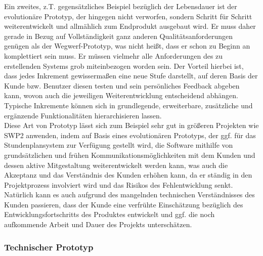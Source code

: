 \documentclass{swp1}
\begin{document}
Ein zweites, z.T. gegensätzliches Beispiel bezüglich der Lebensdauer ist der evolutionäre Prototyp, der hingegen nicht verworfen, sondern Schritt für Schritt weiterentwickelt und allmählich zum Endprodukt ausgebaut wird. Er muss daher gerade in Bezug auf Vollständigkeit ganz anderen Qualitätsanforderungen genügen als der Wegwerf-Prototyp, was nicht heißt, dass er schon zu Beginn an komplettiert sein muss. Er müssen vielmehr alle Anforderungen des zu erstellenden Systems grob miteinbezogen worden sein. Der Vorteil hierbei ist, dass jedes Inkrement gewissermaßen eine neue Stufe darstellt, auf deren Basis der Kunde bzw. Benutzer diesen testen und sein persönliches Feedback abgeben kann, wovon auch die jeweiligen Weiterentwicklung entscheidend abhängen. Typische Inkremente können sich in grundlegende, erweiterbare, zusätzliche und ergänzende Funktionalitäten hierarchisieren lassen. \\
Diese Art von Prototyp lässt sich zum Beispiel sehr gut in größeren Projekten wie SWP2 anwenden, indem auf Basis eines evolutionären Prototyps, der ggf. für das Stundenplansystem zur Verfügung gestellt wird, die Software mithilfe von grundsätzlichen und frühen Kommunikationsmöglichkeiten mit dem Kunden und dessen aktive Mitgestaltung  weiterentwickelt werden kann, was auch die Akzeptanz und das Verständnis des Kunden erhöhen kann, da er ständig in den Projektprozess involviert wird und das Risikos des Fehlentwicklung senkt.\\
Natürlich kann es auch aufgrund des mangelnden technischen Verständnisses des Kunden passieren, dass der Kunde eine verfrühte Einschätzung bezüglich des Entwicklungsfortschritts des Produktes entwickelt und ggf. die noch aufkommende Arbeit und Dauer des Projekts unterschätzen.

\subsubsection*{Technischer Prototyp}
\end{document}
